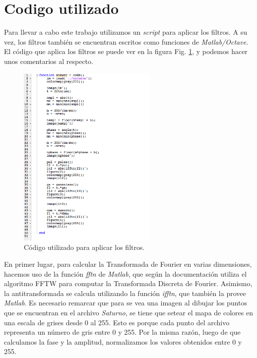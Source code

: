 \documentclass[11pt,a4paper]{emulateapj}
\begin{document}
\section{Codigo utilizado}
\label{sec:sec3}
Para llevar a cabo este trabajo utilizamos un \emph{script} para aplicar los filtros. A su vez, los filtros también se encuentran escritos como funciones de \emph{Matlab/Octave}. El código que aplica los filtros se puede ver en la figura Fig. \ref{fig:codigobase}, y podemos hacer unos comentarios al respecto. 
\begin{figure}
      \includegraphics[width=254px]{images/code.png}
       \caption[Código utilizado para aplicar los filtros.]{Código utilizado para aplicar los filtros.}
     \label{fig:codigobase}
\end{figure}
En primer lugar, para calcular la Transformada de Fourier en varias dimensiones, hacemos uso de la función \emph{fftn} de \emph{Matlab}, que según la documentación utiliza el algoritmo FFTW para computar la Transformada Discreta de Fourier. Asimismo, la antitransformada se calcula utilizando la función \emph{ifftn}, que también la provee \emph{Matlab}. Es necesario remarcar que para se vea una imagen al dibujar los puntos que se encuentran en el archivo \emph{Saturno}, se tiene que setear el mapa de colores en una escala de grises desde 0 al 255. Esto es porque cada punto del archivo representa un número de gris entre 0 y 255. Por la misma razón, luego de que calculamos la fase y la amplitud, normalizamos los valores obtenidos entre 0 y 255.
\end{document}

